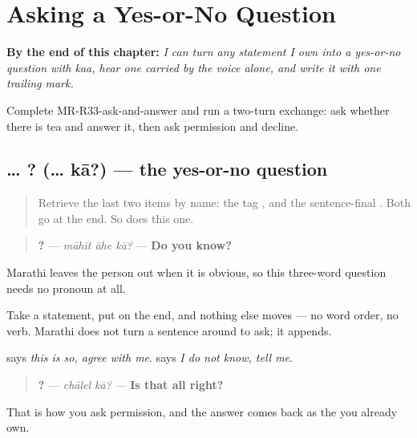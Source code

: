 
\chapter{Asking a Yes-or-No Question}
\label{ch:mr-polar-question}

\begin{chapteropening}
\textbf{By the end of this chapter:} \emph{I can turn any statement I own into a yes-or-no question with kaa, hear one carried by the voice alone, and write it with one trailing mark.}

Complete MR-R33-ask-and-answer and run a two-turn exchange: ask whether there is tea and answer it, then ask permission and decline.
\end{chapteropening}

\section[\texorpdfstring{… \mr{का}? (… kā?)}{… का? (… kā?)}]{… ? (… kā?) — the yes-or-no question}

\label{lesson:MR-C33-kaa-polar}



\begin{quote}
Retrieve the last two items by name: the tag \textbf{}, and the sentence-final \textbf{}. Both go at the end. So does this one.
\end{quote}

\begin{grammarlens}[title={Grammar Lens: \mr{का} at the end}]
\begin{quote}
\textbf{  ?} — \emph{māhīt āhe kā?} — \textbf{Do you know?}
\end{quote}

Marathi leaves the person out when it is obvious, so this three-word question needs no pronoun at all.

Take a statement, put \textbf{} on the end, and nothing else moves — no word order, no verb. Marathi does not turn a sentence around to ask; it appends.

\textbf{} says \emph{this is so, agree with me}. \textbf{} says \emph{I do not know, tell me}.

\begin{quote}
\textbf{ ?} — \emph{chālel kā?} — \textbf{Is that all right?}
\end{quote}

That is how you ask permission, and the answer comes back as the \textbf{} you already own.
\end{grammarlens}

